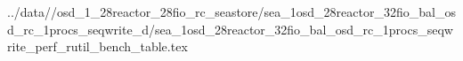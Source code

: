 ../data//osd_1_28reactor_28fio_rc_seastore/sea_1osd_28reactor_32fio_bal_osd_rc_1procs_seqwrite_d/sea_1osd_28reactor_32fio_bal_osd_rc_1procs_seqwrite_perf_rutil_bench_table.tex